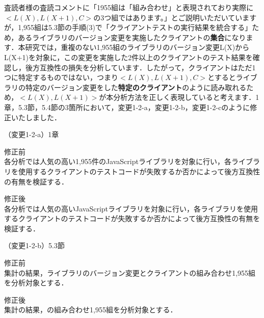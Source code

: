 \documentclass{jarticle} %
\def\subsection#1{ \vspace{1pc} {\gt #1} }
\begin{document}
査読者様の査読コメントに「1955組は「組み合わせ」と表現されており実際に$<L(X),L(X+1),C>$の3つ組ではあります。」とご説明いただいていますが，1,955組は5.3節の手順(3)で「クライアントテストの実行結果を統合する」ため，あるライブラリのバージョン変更を実施したクライアントの\textbf{集合}になります．本研究では，重複のない1,955組のライブラリのバージョン変更L(X)からL(X+1)を対象に，この変更を実施した2件以上のクライアントのテスト結果を確認し，後方互換性の損失を分析しています．したがって，クライアントはただ1つに特定するものではない，つまり$<L(X),L(X+1),C>$とするとライブラリの特定のバージョン変更をした\textbf{特定のクライアント}のように読み取れるため，$<L(X),L(X+1)>$が本分析方法を正しく表現していると考えます．1章，5.3節，5.4節の3箇所において，変更1-2-a，変更1-2-b，変更1-2-cのように修正いたしました．



\subsection{（変更1-2-a）1章}
\vspace{-0.3cm}
\begin{description}
\item 修正前\\
\phantom{　}
各分析では人気の高い1,955件のJavaScriptライブラリを対象に行い，各ライブラリを使用するクライアントのテストコードが失敗するか否かによって後方互換性の有無を検証する．
\vspace{-0.3cm}
\item 修正後\\
\phantom{　}
各分析では人気の高いJavaScriptライブラリ\textcolor{red}{}を対象に行い，各ライブラリを使用するクライアントのテストコードが失敗するか否かによって後方互換性の有無を検証する．
\end{description}

\subsection{（変更1-2-b）5.3節}
\vspace{-0.3cm}
\begin{description}
\item 修正前\\
\phantom{　}
集計の結果，ライブラリのバージョン変更とクライアントの組み合わせ1,955組を分析対象とする．
\vspace{-0.3cm}
\item 修正後\\
\phantom{　}
集計の結果，\textcolor{red}{}の組み合わせ1,955組を分析対象とする．
\end{description}
\end{document}

